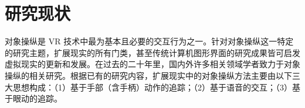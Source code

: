 \chapter{研究现状}

对象操纵是 VR 技术中最为基本且必要的交互行为之一。针对对象操纵这一特定的研究主题，扩展现实的所有门类，甚至传统计算机图形界面的研究成果皆可启发虚拟现实的更新和发展。在过去的二十年里，国内外许多相关领域学者致力于对象操纵的相关研究。根据已有的研究内容，扩展现实中的对象操纵方法主要由以下三大思想构成：（1）基于手部（含手柄）动作的追踪；（2）基于语音的交互；（3）基于眼动的追踪。
